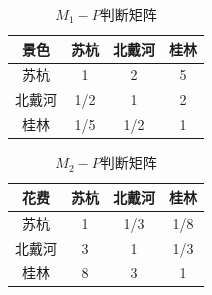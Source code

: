 \documentclass[a4paper]{article}
\begin{document}
    \begin{minipage}{\textwidth}
        \begin{minipage}[H]{0.5\linewidth}
            \centering
            \begin{table}[H]
                \centering
                \caption{$ M_{1}-P $判断矩阵}
                \begin{tabular}{|c|c|c|c|}
                    \hline
                    景色  & 苏杭  & 北戴河 & 桂林 \\ \hline
                    苏杭  & 1   & 2   & 5  \\ \hline
                    北戴河 & 1/2 & 1   & 2  \\ \hline
                    桂林  & 1/5 & 1/2 & 1  \\ \hline
                \end{tabular}
            \end{table}
        \end{minipage}
        \begin{minipage}[H]{0.5\linewidth}
            \centering
            \begin{table}[H]
                \centering
                \caption{$ M_{2}-P $判断矩阵}
                \begin{tabular}{|c|c|c|c|}
                    \hline
                    花费  & 苏杭 & 北戴河 & 桂林  \\ \hline
                    苏杭  & 1  & 1/3 & 1/8 \\ \hline
                    北戴河 & 3  & 1   & 1/3 \\ \hline
                    桂林  & 8  & 3   & 1   \\ \hline
                \end{tabular}
            \end{table}
        \end{minipage}
    \end{minipage}
\end{document}
